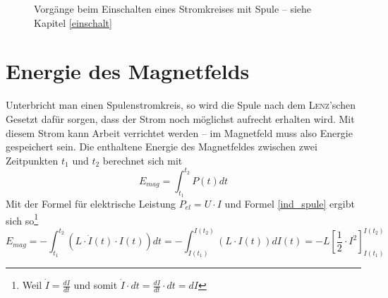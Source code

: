 \begin{figure}[h]
\centering
{}
\caption{Vorgänge beim Einschalten eines Stromkreises mit Spule -- siehe Kapitel \ref{einschalt}}
\label{oszi}
\end{figure}



		\section{Energie des Magnetfelds}

Unterbricht man einen Spulenstromkreis, so wird die Spule nach dem \textsc{Lenz}'schen Gesetzt dafür sorgen, dass der Strom noch möglichst aufrecht erhalten wird. Mit diesem Strom kann Arbeit verrichtet werden -- im Magnetfeld muss also Energie gespeichert sein. Die enthaltene Energie des Magnetfeldes zwischen zwei Zeitpunkten \(t_1\) und \(t_2\) berechnet sich mit
\begin{equation}
E_{mag} = \int_{t_1}^{t_2} P(t) dt
\label{int_Emag}
\end{equation}
Mit der Formel für elektrische Leistung \(P_{el} = U \cdot I\) und Formel \ref{ind_spule} ergibt sich so\footnote{Weil \(\dot{I} = \frac{dI}{dt}\) und somit \( \dot{I} \cdot dt = \frac{dI}{dt} \cdot dt = dI\)}
\begin{equation}
E_{mag} = - \int_{t_1}^{t_2} \left ( L \cdot \dot{I}(t) \cdot I(t) \right ) dt = 
- \int_{I(t_1)}^{I(t_2)} \left ( L \cdot I(t) \right ) dI(t) = 
- L \left [ \frac{1}{2} \cdot I^2 \right ]_{I(t_1)}^{I(t_2)}
\label{e_mag}
\end{equation}


